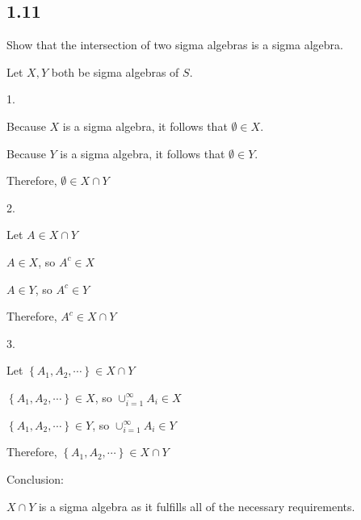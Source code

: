 \subsection*{1.11}

Show that the intersection of two sigma algebras is a sigma algebra.

\bigskip
\noindent {}
\bigskip


Let $X, Y$ both be sigma algebras of $S$.

1.

Because $X$ is a sigma algebra, it follows that $\emptyset \in X$.

Because $Y$ is a sigma algebra, it follows that $\emptyset \in Y$.

Therefore, $\emptyset \in X \cap Y$


2.

Let $A \in X \cap Y$

$A \in X$, so $A^c \in X$ 

$A \in Y$, so $A^c \in Y$

Therefore, $A^c \in X \cap Y$

3. 

Let $\left\{ A_1, A_2, \cdots \right\} \in X \cap Y$

$\left\{ A_1, A_2, \cdots \right\} \in X$, so $\cup_{i=1}^{\infty} A_i \in X$

$\left\{ A_1, A_2, \cdots \right\} \in Y$, so $\cup_{i=1}^{\infty} A_i \in Y$

Therefore, $\left\{ A_1, A_2, \cdots \right\} \in X \cap Y$

Conclusion: 

$X \cap Y$ is a sigma algebra as it fulfills all of the necessary requirements.
